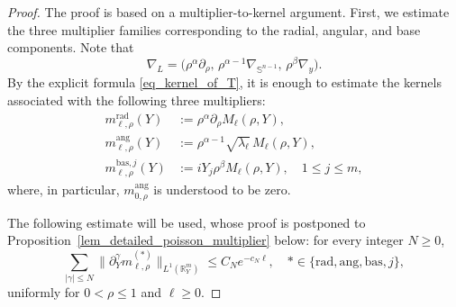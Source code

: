 \documentclass[12pt]{amsart}
\begin{document}
\begin{proof}
The proof is based on a multiplier-to-kernel argument. First, we estimate the three multiplier families corresponding to the radial, angular, and base components. Note that
\begin{equation*}
    \nabla_L = \bigl( \rho^\alpha \partial_\rho, \, \rho^{\alpha-1} \nabla_{\mathbb{S}^{n-1}}, \, \rho^{\beta} \nabla_y \bigr).
\end{equation*}
By the explicit formula \eqref{eq_kernel_of_T}, it is enough to estimate the kernels associated with the following three multipliers:
\begin{align*}
m_{\ell,\rho}^{\mathrm{rad}}(Y)&:= \rho^{\alpha} \partial_\rho M_{\ell}(\rho, Y),\\
m_{\ell,\rho}^{\mathrm{ang}}(Y)&:= \rho^{\alpha-1} \sqrt{\lambda_\ell} \, M_{\ell}(\rho, Y),\\
m_{\ell,\rho}^{\mathrm{bas},j}(Y)&:= i Y_j \rho^{\beta} M_{\ell}(\rho, Y), \quad 1 \le j \le m,
\end{align*}
where, in particular, $m_{0,\rho}^{\mathrm{ang}}$ is understood to be zero.

The following estimate will be used, whose proof is postponed to Proposition~\ref{lem_detailed_poisson_multiplier} below: for every integer $N \ge 0$,
\begin{equation}\label{eq_detailed_poisson_multiplier_goal_copy}
    \sum_{|\gamma|\le N}
    \bigl\|
        \partial_Y^\gamma m_{\ell,\rho}^{(*)}
    \bigr\|_{L^1(\mathbb R^m_Y)}
    \le
    C_N e^{-c_N \ell},
    \quad
    *\in \{ \mathrm{rad}, \mathrm{ang}, \mathrm{bas}, j\},
\end{equation}
uniformly for $0<\rho\le 1$ and $\ell\ge 0$.


\end{proof}
\end{document}
